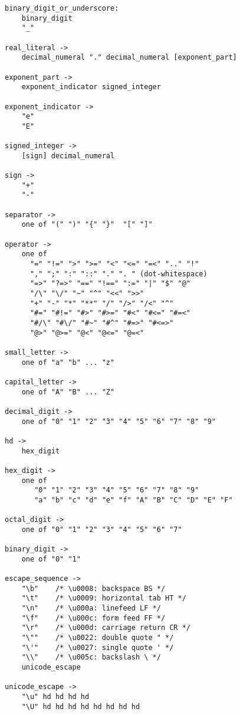 \begin{scriptsize}
\begin{verbatim}
binary_digit_or_underscore:
    binary_digit
    "_" 

real_literal ->
    decimal_numeral "." decimal_numeral [exponent_part] 

exponent_part ->
    exponent_indicator signed_integer

exponent_indicator ->
    "e" 
    "E"

signed_integer ->
    [sign] decimal_numeral

sign ->
    "+"
    "-"

separator ->
    one of "(" ")" "{" "}"  "[" "]"  

operator ->
    one of
      "=" "!=" ">" ">=" "<" "<=" "=<" ".." "!"
      "," ";" ":" "::" "." ". " (dot-whitespace)
      "=>" "?=>" "==" "!==" ":=" "|" "$" "@"
      "/\" "\/" "~" "^" "<<" ">>"
      "+" "-" "*" "**" "/" "/>" "/<" "^" 
      "#=" "#!=" "#>" "#>=" "#<" "#<=" "#=<"
      "#/\" "#\/" "#~" "#^" "#=>" "#<=>"
      "@>" "@>=" "@<" "@<=" "@=<"

small_letter ->
    one of "a" "b" ... "z"

capital_letter ->
    one of "A" "B" ... "Z"

decimal_digit ->
    one of "0" "1" "2" "3" "4" "5" "6" "7" "8" "9"

hd ->
    hex_digit

hex_digit ->
    one of 
       "0" "1" "2" "3" "4" "5" "6" "7" "8" "9" 
       "a" "b" "c" "d" "e" "f" "A" "B" "C" "D" "E" "F"

octal_digit ->
    one of "0" "1" "2" "3" "4" "5" "6" "7"

binary_digit ->
    one of "0" "1" 

escape_sequence ->
    "\b"    /* \u0008: backspace BS */
    "\t"    /* \u0009: horizontal tab HT */
    "\n"    /* \u000a: linefeed LF */
    "\f"    /* \u000c: form feed FF */
    "\r"    /* \u000d: carriage return CR */
    "\""    /* \u0022: double quote " */
    "\'"    /* \u0027: single quote ' */
    "\\"    /* \u005c: backslash \ */
    unicode_escape 

unicode_escape ->
    "\u" hd hd hd hd 
    "\U" hd hd hd hd hd hd hd hd 
\end{verbatim}
\end{scriptsize}
\ignore{

}
